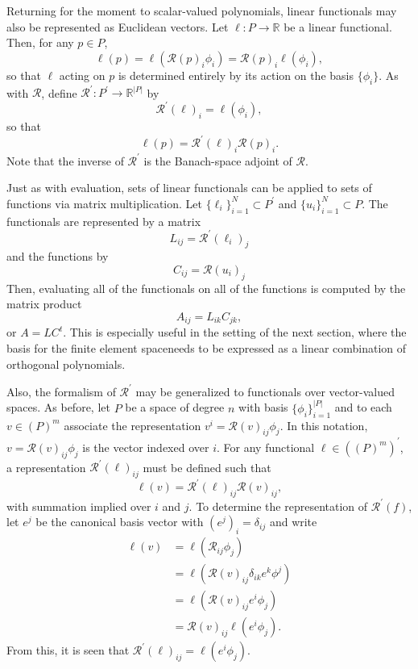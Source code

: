 Returning for the moment to scalar-valued polynomials, linear
functionals may also be represented as 
Euclidean vectors.  Let \( \ell: P \rightarrow \mathbb{R} \) be a linear
functional.  Then, for any \( p \in P \), 
\[
\ell( p ) = \ell( \mathcal{R}(p)_i \phi_i )
= \mathcal{R}(p)_i \ell( \phi_i ),
\]
so that \( \ell \) acting on \( p \) is determined entirely by its
action on the basis \( \{ \phi_i \} \).  As with \( \mathcal{R} \), define
\( \mathcal{R}^\prime : P^\prime \rightarrow \mathbb{R}^{|P|} \) by
\[ 
  \mathcal{R}^\prime (\ell)_i
= \ell( \phi_i),
\]
so that
\[
\ell(p) = \mathcal{R}^\prime(\ell)_i\mathcal{R}(p)_i.
\]
Note that the inverse of \( \mathcal{R}^\prime \) is the Banach-space
adjoint of \( \mathcal{R} \).

Just as with evaluation, sets of linear functionals can be applied to
sets of functions via matrix multiplication.  Let \( \{ \ell_i
\}_{i=1}^N \subset P^\prime \) and \( \{ u_i \}_{i=1}^N \subset P \).
The functionals are represented by a matrix
\[
L_{ij} = \mathcal{R}^\prime(\ell_i)_j
\]
and the functions by
\[
C_{ij} = \mathcal{R}(u_i)_j
\]
Then, evaluating all of the functionals on all of the functions is
computed by the matrix product
\begin{equation}
A_{ij} = L_{ik}C_{jk},
\end{equation}
or \( A = L C^t \).  This is especially useful in the setting of the
next section, where the basis for the finite element spaceneeds to be
expressed as a linear combination of orthogonal polynomials.

Also, the formalism of \( \mathcal{R}^\prime \) may be generalized to
functionals over vector-valued spaces.  As before, let \( P \) be a
space of degree \( n \) with basis \( \{ \phi_i \}_{i=1}^{|P|} \) and
to each \( v \in (P)^m \) associate the representation \( v^i
= \mathcal{R}(v)_{ij}\phi_j \).  In this notation, 
\( v = \mathcal{R}(v)_{ij} \phi_j \) is the vector indexed over \( i \).
For any functional
\( \ell \in \left( \left(P\right)^m \right)^\prime \), a 
representation \( \mathcal{R}^\prime(\ell)_{ij} \) must be defined
such that 
\[
\ell(v) = \mathcal{R}^\prime(\ell)_{ij} \mathcal{R}(v)_{ij},
\]
with summation implied over \(i\) and \( j\).  To determine the
representation of \( \mathcal{R}^\prime(f) \), let \( e^j \) be the
canonical basis vector with \( (e^j)_i = \delta_{ij} \) and 
write
\begin{equation}
\begin{split}
\ell(v) & = \ell( \mathcal{R}_{ij}\phi_j ) \\
& = \ell( \mathcal{R}(v)_{ij} \delta_{ik} e^k \phi^j ) \\
& = \ell( \mathcal{R}(v)_{ij} e^i \phi_j ) \\
& = \mathcal{R}(v)_{ij} \ell( e^i \phi_j ).
\end{split}
\end{equation}
From this, it is seen that \( \mathcal{R}^\prime(\ell)_{ij} = \ell(
e^i \phi_j ) \).


